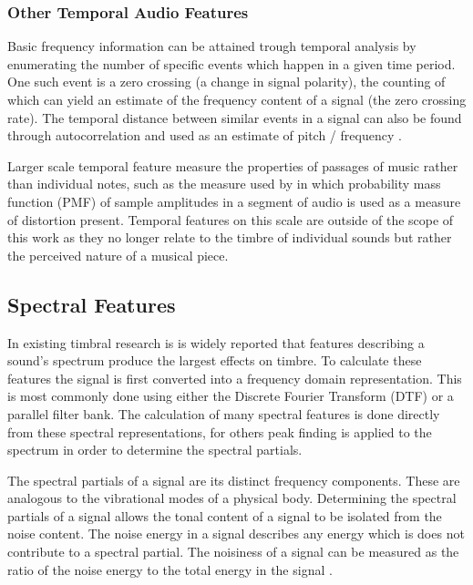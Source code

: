 		\subsubsection*{Other Temporal Audio Features}
			Basic frequency information can be attained trough temporal analysis by enumerating the number of
			specific events which happen in a given time period. One such event is a zero crossing (a change in
			signal polarity), the counting of which can yield an estimate of the frequency content of a signal
			(the zero crossing rate). The temporal distance between similar events in a signal can also be
			found through autocorrelation and used as an estimate of pitch / frequency \citep{mcleod2005a}.

			Larger scale temporal feature measure the properties of passages of music rather than individual
			notes, such as the measure used by \citet{wilson2014profiling} in which probability mass function
			(PMF) of sample amplitudes in a segment of audio is used as a measure of distortion present.
			Temporal features on this scale are outside of the scope of this work as they no longer relate to
			the timbre of individual sounds but rather the perceived nature of a musical piece.

	\subsection{Spectral Features}
	\label{sec:Timbre-LowLevelFeatures-Spectral}
		In existing timbral research is is widely reported that features describing a sound's spectrum produce the
		largest effects on timbre. To calculate these features the signal is first converted into a frequency
		domain representation. This is most commonly done using either the Discrete Fourier Transform (DTF) or a
		parallel filter bank. The calculation of many spectral features is done directly from these spectral
		representations, for others peak finding is applied to the spectrum in order to determine the spectral
		partials.

		The spectral partials of a signal are its distinct frequency components. These are analogous to the
		vibrational modes of a physical body. Determining the spectral partials of a signal allows the tonal
		content of a signal to be isolated from the noise content. The noise energy in a signal describes any
		energy which is does not contribute to a spectral partial. The noisiness of a signal can be measured as the
		ratio of the noise energy to the total energy in the signal \citep{serra1998sound}.

